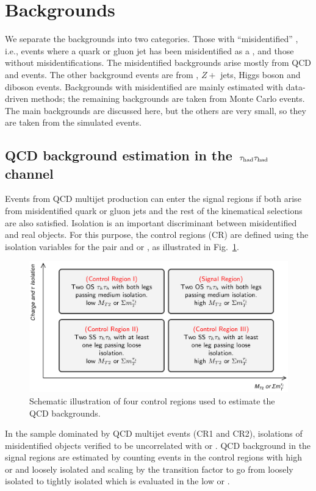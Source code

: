 \section{Backgrounds}
\label{sect:bkg}
We separate the backgrounds into two categories.  Those with 
``misidentified'' \Tau, i.e., events where a quark or gluon jet has been misidentified
as a \Tau, and those without \Tau misidentifications.  
The misidentified \Tau backgrounds arise mostly from QCD and \wjets events.  The 
other background events are from \ttbar, $Z+$ jets, Higgs boson and diboson events.
Backgrounds with misidentified \Tau are mainly estimated with data-driven methods; the 
remaining backgrounds are taken from Monte Carlo events. The main backgrounds
are discussed here, but the others are very small, so they are  taken from the simulated events.

\subsection{\texorpdfstring{QCD background estimation in the $\,\tau_{\rm had}\tau_{\rm had}$ channel}{QCD background estimation in the tau-tau channel}}
\label{sect:bkgQCD}
Events from QCD multijet production can enter the signal regions 
if both \Tau arise from misidentified quark or gluon jets
and the rest of the kinematical selections are also satisfied.  
Isolation is an important 
discriminant between misidentified and real \Tau objects. For this purpose, the control regions (CR) are defined using the isolation variables for the \Tau 
pair and \mttwo or \SumMT, as illustrated in Fig.~\ref{fig:ABCDQCD}. 
\begin{figure}[!Hhtb]
\centering
\includegraphics[angle=0,scale=0.28]{Bkg/ABCD.png}
\caption{Schematic illustration of four control regions used to estimate the QCD backgrounds.}
\label{fig:ABCDQCD}
\end{figure}
In the sample dominated by QCD multijet events (CR1 and CR2), isolations of misidentified \Tau objects verified 
to be uncorrelated with \mttwo or \SumMT.
QCD background in the signal regions are estimated by counting events in the control regions with high \mttwo or \SumMT and loosely isolated \Tau
and scaling by the transition factor to go from loosely isolated to tightly isolated \Tau which is evaluated in the low \mttwo or \SumMT.

